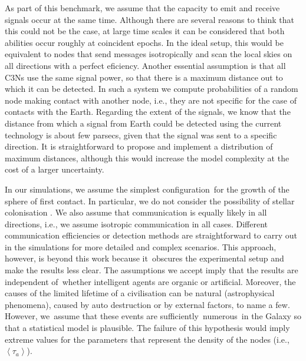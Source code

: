 \documentclass[crop]{CSLB}
\newcommand{\cetis}{C3Ns}
\begin{document}
As part of this benchmark, we assume that the capacity to emit and receive
signals occur at the same time.
%
Although there are several reasons to think that this could not be the case, at
large time scales it can be considered that both abilities occur roughly at
coincident epochs.
%
In the ideal setup, this would be equivalent to nodes that send messages
isotropically and scan the local skies on all directions with a perfect
eficiency.
%
Another essential assumption is that all \cetis{} use the same signal power, so
that there is a maximum distance out to which it can be detected.
%
In such a system we compute probabilities of a random node making contact with
another node, i.e., they are not specific for the case of contacts with the
Earth.
%
Regarding the extent of the signals, we know that the distance from which a
signal from Earth could be detected using the current technology is about few
parsecs, given that the signal was sent to a specific direction.
%
It is straightforward to propose and implement a distribution of maximum
distances, although this would increase the model complexity at the cost of a
larger uncertainty.



In our simulations, we assume the simplest configuration for the
growth of the sphere of first contact.
%
In particular, we do not consider the
possibility of stellar colonisation
\citep[e.g.][]{newman_galactic_1981, walters_interstellar_1980,
starling_virulence_2013, barlow_galactic_2012, jeong_large_2000,
maccone_mathematical_2011}.
%
We also assume that communication is
equally likely in all directions, i.e., we assume isotropic
communication in all cases.
%
Different communication efficiencies or
detection methods are straightforward to carry out in the simulations
for more detailed and complex scenarios.
%
This approach, however, is
beyond this work because it obscures the experimental setup and make
the results less clear.
%
The assumptions we accept imply that the
results are independent of whether intelligent agents are organic or
artificial.
%
Moreover, the causes of the limited lifetime of a
civilisation can be natural (astrophysical phenomena), caused by auto
destruction or by external factors, to name a few.
%
However, we assume
that these events are sufficiently numerous in the Galaxy so that a
statistical model is plausible. The failure of this hypothesis would
imply extreme values for the parameters that represent the density of
the nodes (i.e., $\left< \tau_a \right>$).
\end{document}
